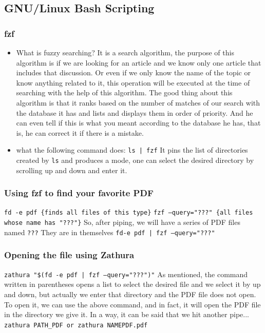 \documentclass[12pt]{article}
\begin{document}
\newpage
\subsection{GNU/Linux Bash Scripting}


\subsubsection{fzf}
\begin{itemize}
  \item What is fuzzy searching?\newline
  It is a search algorithm, the purpose of this algorithm is if we are looking for an article and we know only one article that includes that discussion.
Or even if we only know the name of the topic or know anything related to it, this operation will be executed at the time of searching with the help of this algorithm.
The good thing about this algorithm is that it ranks based on the number of matches of our search with the database it has and lists and displays them in order of priority.
And he can even tell if this is what you meant according to the database he has, that is, he can correct it if there is a mistake.
\item what the following command does: \texttt{ls | fzf}\newline
It pins the list of directories created by \texttt{ls} and produces a mode, one can select the desired directory by scrolling up and down and enter it.
\end{itemize}



\subsubsection{Using fzf to find your favorite PDF}
\texttt{fd -e pdf \{finds all files of this type\}}\newline
\texttt{fzf --query="???" \{all files whose name has "???"\}}\newline
So, after piping, we will have a series of PDF files named \texttt{???} They are in themselves\newline
\texttt{fd-e pdf | fzf --query="???"}


\subsubsection{Opening the file using Zathura}
\texttt{zathura "\$(fd -e pdf | fzf --query="???")"} \newline
As mentioned, the command written in parentheses opens a list to select the desired file and we select it by up and down, but actually we enter that directory and the PDF file does not open.
To open it, we can use the above command, and in fact, it will open the PDF file in the directory we give it.
\newline
In a way, it can be said that we hit another pipe...
\newline
\texttt{zathura PATH\_PDF or zathura NAMEPDF.pdf}
\end{document}
